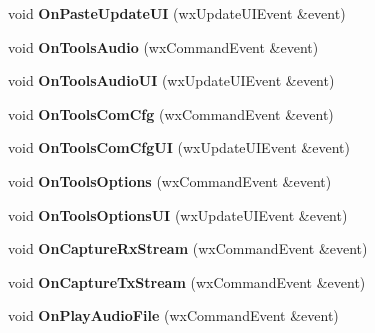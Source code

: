 \begin{DoxyCompactItemize}
\item 
\hypertarget{class_main_frame_a096dd35dab302c41ba1d97c21cda5026}{void {\bfseries On\-Paste\-Update\-U\-I} (wx\-Update\-U\-I\-Event \&event)}\label{class_main_frame_a096dd35dab302c41ba1d97c21cda5026}

\item 
\hypertarget{class_main_frame_a82a92e9b1ea9ffdd26badd5b74ee254d}{void {\bfseries On\-Tools\-Audio} (wx\-Command\-Event \&event)}\label{class_main_frame_a82a92e9b1ea9ffdd26badd5b74ee254d}

\item 
\hypertarget{class_main_frame_abecf4d16789e14b0f42177a939eb07f4}{void {\bfseries On\-Tools\-Audio\-U\-I} (wx\-Update\-U\-I\-Event \&event)}\label{class_main_frame_abecf4d16789e14b0f42177a939eb07f4}

\item 
\hypertarget{class_main_frame_a560029fb1c277c79bd932c047ec9effd}{void {\bfseries On\-Tools\-Com\-Cfg} (wx\-Command\-Event \&event)}\label{class_main_frame_a560029fb1c277c79bd932c047ec9effd}

\item 
\hypertarget{class_main_frame_acd3cdef97be73dd70187f21016eeb1cb}{void {\bfseries On\-Tools\-Com\-Cfg\-U\-I} (wx\-Update\-U\-I\-Event \&event)}\label{class_main_frame_acd3cdef97be73dd70187f21016eeb1cb}

\item 
\hypertarget{class_main_frame_a82b97e0f3c4e530d5700b2c2dbac42bf}{void {\bfseries On\-Tools\-Options} (wx\-Command\-Event \&event)}\label{class_main_frame_a82b97e0f3c4e530d5700b2c2dbac42bf}

\item 
\hypertarget{class_main_frame_ac7ceb1e047f2f3b0c26c0b42a110fe99}{void {\bfseries On\-Tools\-Options\-U\-I} (wx\-Update\-U\-I\-Event \&event)}\label{class_main_frame_ac7ceb1e047f2f3b0c26c0b42a110fe99}

\item 
\hypertarget{class_main_frame_a29cacc38a66c9e000f7f512ebf14473b}{void {\bfseries On\-Capture\-Rx\-Stream} (wx\-Command\-Event \&event)}\label{class_main_frame_a29cacc38a66c9e000f7f512ebf14473b}

\item 
\hypertarget{class_main_frame_ac4bb829b48fa6e931098436e87c5fd8c}{void {\bfseries On\-Capture\-Tx\-Stream} (wx\-Command\-Event \&event)}\label{class_main_frame_ac4bb829b48fa6e931098436e87c5fd8c}

\item 
\hypertarget{class_main_frame_ae0c35052e6bb6642ebbbe5c8de7be68e}{void {\bfseries On\-Play\-Audio\-File} (wx\-Command\-Event \&event)}\label{class_main_frame_ae0c35052e6bb6642ebbbe5c8de7be68e}


\end{DoxyCompactItemize}
